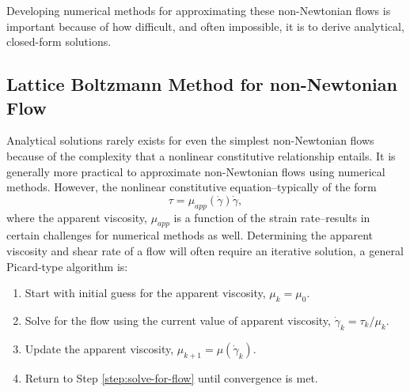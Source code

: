 \documentclass[pdftex,ms]{pittetd}
\begin{document}
Developing numerical methods for approximating these non-Newtonian flows is important because of how difficult, and often impossible, it is to derive analytical, closed-form solutions.

\subsection{Lattice Boltzmann Method for non-Newtonian Flow} \label{sec:lbm-for-nnf} %

Analytical solutions rarely exists for even the simplest non-Newtonian flows because of the complexity that a nonlinear constitutive relationship entails.
It is generally more practical to approximate non-Newtonian flows using numerical methods.
However, the nonlinear constitutive equation--typically of the form \begin{equation} \label{eq:non-newtonian}
\tau = \mu_{app}(\dot{\gamma}) \dot{\gamma},
\end{equation}\noindent where the apparent viscosity, $\mu_{app}$ is a function of the strain rate--results in certain challenges for numerical methods as well.
Determining the apparent viscosity and shear rate of a flow will often require an iterative solution, a general Picard-type algorithm is:

\begin{enumerate}
	\item Start with initial guess for the apparent viscosity, $\mu_k = \mu_0$.
	\item \label{step:solve-for-flow} Solve for the flow using the current value of apparent viscosity, $\dot{\gamma}_k = \tau_k / \mu_k$.
	\item Update the apparent viscosity, $\mu_{k+1} = \mu(\dot{\gamma}_k)$.
	\item Return to Step \ref{step:solve-for-flow} until convergence is met.
\end{enumerate}
\end{document}
